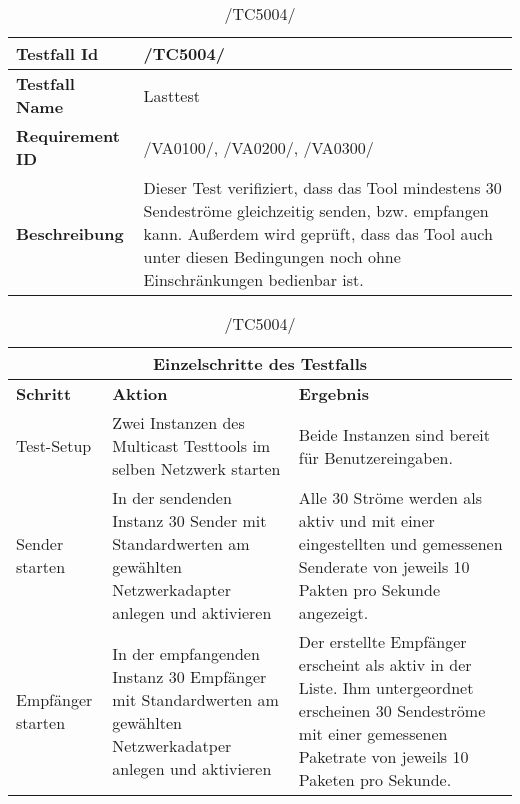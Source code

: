     \begin{table}[h]
        \caption{/TC5004/}
        \label{tab:TC5004}
        \begin{center}
            \begin{tabular}{|p{3.5cm}|p{12cm}|}
                \hline
                    \textbf{Testfall Id} & /TC5004/\\
                \hline
                    \textbf{Testfall Name} & Lasttest\\
                \hline
                    \textbf{Requirement ID} & /VA0100/, /VA0200/, /VA0300/\\
                \hline
                    \textbf{Beschreibung} & Dieser Test verifiziert, dass das
                    Tool mindestens 30 Sendeströme gleichzeitig senden, bzw.
                    empfangen kann. Außerdem wird geprüft, dass das Tool auch
                    unter diesen Bedingungen noch ohne Einschränkungen
                    bedienbar ist.\\
                \hline
            \end{tabular}
            \begin{tabular}{|p{3.5cm}|p{5cm}|p{6.55cm}|}
                \multicolumn{3}{|c|}{\textbf{Einzelschritte des Testfalls}} \\
                \hline
                    \textbf{Schritt} & \textbf{Aktion} & \textbf{Ergebnis}\\
                \hline
                    Test-Setup & Zwei Instanzen des Multicast Testtools im
                    selben Netzwerk starten &
                    Beide Instanzen sind bereit für Benutzereingaben.\\
                \hline
                    Sender starten &
                    In der sendenden Instanz 30 Sender mit Standardwerten am
                    gewählten Netzwerkadapter anlegen und aktivieren &
                    Alle 30 Ströme werden als aktiv und mit einer
                    eingestellten und gemessenen Senderate von jeweils 10
                    Pakten pro Sekunde angezeigt.\\
                \hline
                    Empfänger starten &
                    In der empfangenden Instanz 30 Empfänger mit Standardwerten
                    am gewählten Netzwerkadatper anlegen und aktivieren &
                    Der erstellte Empfänger erscheint als aktiv in der Liste.
                    Ihm untergeordnet erscheinen 30 Sendeströme mit einer
                    gemessenen Paketrate von jeweils 10 Paketen pro Sekunde.\\

\end{tabular}
\end{center}
\end{table}
